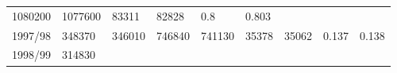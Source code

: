 \documentclass[
  spanish,
]{article}
\begin{document}
\begin{longtable}[]{@{}lllllllll@{}}
\begin{minipage}[t]{0.09\columnwidth}
1080200\strut
\end{minipage} & \begin{minipage}[t]{0.10\columnwidth}\raggedright
1077600\strut
\end{minipage} & \begin{minipage}[t]{0.08\columnwidth}\raggedright
83311\strut
\end{minipage} & \begin{minipage}[t]{0.09\columnwidth}\raggedright
82828\strut
\end{minipage} & \begin{minipage}[t]{0.08\columnwidth}\raggedright
0.8\strut
\end{minipage} & \begin{minipage}[t]{0.09\columnwidth}\raggedright
0.803\strut
\end{minipage}\tabularnewline
\begin{minipage}[t]{0.06\columnwidth}\raggedright
1997/98\strut
\end{minipage} & \begin{minipage}[t]{0.09\columnwidth}\raggedright
348370\strut
\end{minipage} & \begin{minipage}[t]{0.10\columnwidth}\raggedright
346010\strut
\end{minipage} & \begin{minipage}[t]{0.09\columnwidth}\raggedright
746840\strut
\end{minipage} & \begin{minipage}[t]{0.10\columnwidth}\raggedright
741130\strut
\end{minipage} & \begin{minipage}[t]{0.08\columnwidth}\raggedright
35378\strut
\end{minipage} & \begin{minipage}[t]{0.09\columnwidth}\raggedright
35062\strut
\end{minipage} & \begin{minipage}[t]{0.08\columnwidth}\raggedright
0.137\strut
\end{minipage} & \begin{minipage}[t]{0.09\columnwidth}\raggedright
0.138\strut
\end{minipage}\tabularnewline
\begin{minipage}[t]{0.06\columnwidth}\raggedright
1998/99\strut
\end{minipage} & \begin{minipage}[t]{0.09\columnwidth}\raggedright
314830\strut
\end{minipage} & \begin{minipage}[t]{0.10\columnwidth}\raggedright

\end{minipage}
\end{longtable}
\end{document}
